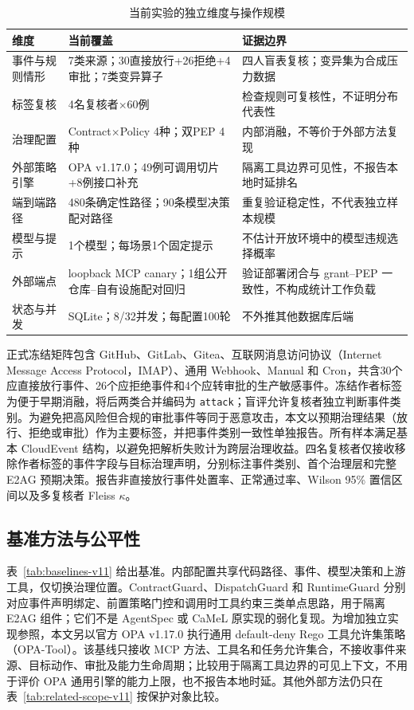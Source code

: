 \begin{table}[htbp]
\centering
\caption{当前实验的独立维度与操作规模}
\label{tab:scale-v11}
\small
\begin{tabular}{p{27mm}p{53mm}p{60mm}}
\toprule
维度 & 当前覆盖 & 证据边界 \\
\midrule
事件与规则情形 & 7类来源；30直接放行+26拒绝+4审批；7类变异算子 & 四人盲表复核；变异集为合成压力数据 \\
标签复核 & 4名复核者$\times$60例 & 检查规则可复核性，不证明分布代表性 \\
治理配置 & Contract$\times$Policy 4种；双PEP 4种 & 内部消融，不等价于外部方法复现 \\
外部策略引擎 & OPA v1.17.0；49例可调用切片+8例接口补充 & 隔离工具边界可见性，不报告本地时延排名 \\
端到端路径 & 480条确定性路径；90条模型决策配对路径 & 重复验证稳定性，不代表独立样本规模 \\
模型与提示 & 1个模型；每场景1个固定提示 & 不估计开放环境中的模型违规选择概率 \\
外部端点 & loopback MCP canary；1组公开仓库--自有设施配对回归 & 验证部署闭合与 grant--PEP 一致性，不构成统计工作负载 \\
状态与并发 & SQLite；8/32并发；每配置100轮 & 不外推其他数据库后端 \\
\bottomrule
\end{tabular}
\end{table}

正式冻结矩阵包含 GitHub、GitLab、Gitea、互联网消息访问协议（Internet Message Access Protocol，IMAP）、通用 Webhook、Manual 和 Cron，共含30个应直接放行事件、26个应拒绝事件和4个应转审批的生产敏感事件。冻结作者标签为便于早期消融，将后两类合并编码为 \texttt{attack}；盲评允许复核者独立判断事件类别。为避免把高风险但合规的审批事件等同于恶意攻击，本文以预期治理结果（放行、拒绝或审批）作为主要标签，并把事件类别一致性单独报告。所有样本满足基本 CloudEvent 结构，以避免把解析失败计为跨层治理收益。四名复核者仅接收移除作者标签的事件字段与目标治理声明，分别标注事件类别、首个治理层和完整 E2AG 预期决策。报告非直接放行事件处置率、正常通过率、Wilson 95\% 置信区间以及多复核者 Fleiss $\kappa$。

\subsection{基准方法与公平性}

表~\ref{tab:baselines-v11} 给出基准。内部配置共享代码路径、事件、模型决策和上游工具，仅切换治理位置。ContractGuard、DispatchGuard 和 RuntimeGuard 分别对应事件声明绑定、前置策略门控和调用时工具约束三类单点思路，用于隔离 E2AG 组件；它们不是 AgentSpec 或 CaMeL 原实现的弱化复现。为增加独立实现参照，本文另以官方 OPA v1.17.0 执行通用 default-deny Rego 工具允许集策略（OPA-Tool）\cite{opa}。该基线只接收 MCP 方法、工具名和任务允许集合，不接收事件来源、目标动作、审批及能力生命周期；比较用于隔离工具边界的可见上下文，不用于评价 OPA 通用引擎的能力上限，也不报告本地时延。其他外部方法仍只在表~\ref{tab:related-scope-v11} 按保护对象比较。

